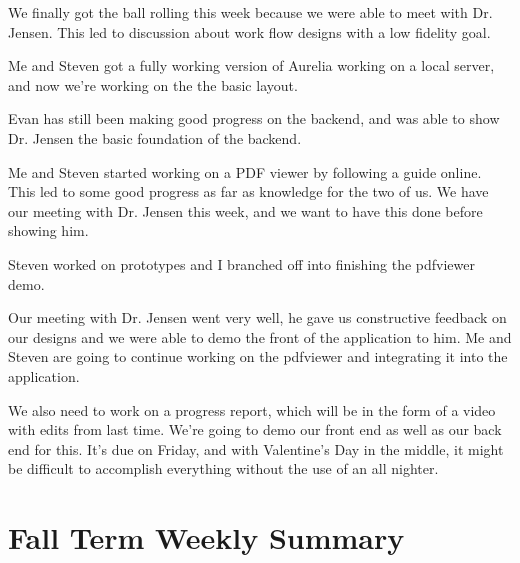 \documentclass[onecolumn, draftclsnofoot,10pt, compsoc]{IEEEtran}
\begin{document}
We finally got the ball rolling this week because we were able to meet with 
Dr. Jensen. This led to discussion about work flow designs with a low 
fidelity goal.

Me and Steven got a fully working version of Aurelia working on a local 
server, and now we're working on the the basic layout.

Evan has still been making good progress on the backend, and was able to show 
Dr. Jensen the basic foundation of the backend. 

Me and Steven started working on a PDF viewer by following a guide online. 
This led to some good progress as far as knowledge for the two of us. We have 
our meeting with Dr. Jensen this week, and we want to have this done before 
showing him.

Steven worked on prototypes and I branched off into finishing the 
pdfviewer demo. 


Our meeting with Dr. Jensen went very well, he gave us constructive feedback 
on our designs and we were able to demo the front of the application to him. 
Me and Steven are going to continue working on the pdfviewer and integrating 
it into the application.

We also need to work on a progress report, which will be in the form of a video 
with edits from last time. We're going to demo our front end as well as our 
back end for this. It's due on Friday, and with Valentine's Day in the middle, 
it might be difficult to accomplish everything without the use of an all nighter.




\section{Fall Term Weekly Summary}
\end{document}

